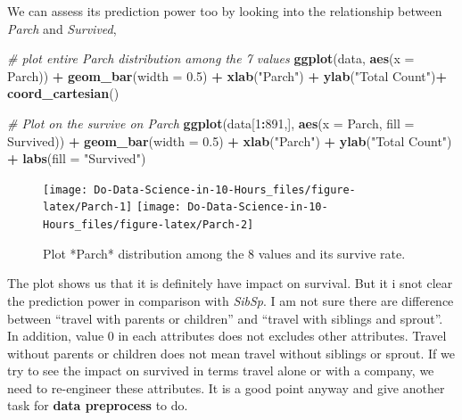 \documentclass[
]{book}
\newenvironment{Shaded}{\begin{snugshade}}{\end{snugshade}}
\newcommand{\CommentTok}[1]{\textcolor[rgb]{0.56,0.35,0.01}{\textit{#1}}}
\newcommand{\DataTypeTok}[1]{\textcolor[rgb]{0.13,0.29,0.53}{#1}}
\newcommand{\DecValTok}[1]{\textcolor[rgb]{0.00,0.00,0.81}{#1}}
\newcommand{\FloatTok}[1]{\textcolor[rgb]{0.00,0.00,0.81}{#1}}
\newcommand{\KeywordTok}[1]{\textcolor[rgb]{0.13,0.29,0.53}{\textbf{#1}}}
\newcommand{\NormalTok}[1]{#1}
\newcommand{\OperatorTok}[1]{\textcolor[rgb]{0.81,0.36,0.00}{\textbf{#1}}}
\newcommand{\StringTok}[1]{\textcolor[rgb]{0.31,0.60,0.02}{#1}}
\begin{document}
We can assess its prediction power too by looking into the relationship between \emph{Parch} and \emph{Survived},

\begin{Shaded}
\begin{Highlighting}[]
\CommentTok{# plot entire Parch distribution among the 7 values}
\KeywordTok{ggplot}\NormalTok{(data, }\KeywordTok{aes}\NormalTok{(}\DataTypeTok{x =}\NormalTok{ Parch)) }\OperatorTok{+}
\StringTok{  }\KeywordTok{geom_bar}\NormalTok{(}\DataTypeTok{width =} \FloatTok{0.5}\NormalTok{) }\OperatorTok{+}
\StringTok{  }\KeywordTok{xlab}\NormalTok{(}\StringTok{"Parch"}\NormalTok{) }\OperatorTok{+}
\StringTok{  }\KeywordTok{ylab}\NormalTok{(}\StringTok{"Total Count"}\NormalTok{)}\OperatorTok{+}
\StringTok{  }\KeywordTok{coord_cartesian}\NormalTok{()}

\CommentTok{# Plot on the survive on Parch}
\KeywordTok{ggplot}\NormalTok{(data[}\DecValTok{1}\OperatorTok{:}\DecValTok{891}\NormalTok{,], }\KeywordTok{aes}\NormalTok{(}\DataTypeTok{x =}\NormalTok{ Parch, }\DataTypeTok{fill =}\NormalTok{ Survived)) }\OperatorTok{+}
\StringTok{  }\KeywordTok{geom_bar}\NormalTok{(}\DataTypeTok{width =} \FloatTok{0.5}\NormalTok{) }\OperatorTok{+}
\StringTok{  }\KeywordTok{xlab}\NormalTok{(}\StringTok{"Parch"}\NormalTok{) }\OperatorTok{+}
\StringTok{  }\KeywordTok{ylab}\NormalTok{(}\StringTok{"Total Count"}\NormalTok{)  }\OperatorTok{+}
\StringTok{  }\KeywordTok{labs}\NormalTok{(}\DataTypeTok{fill =} \StringTok{"Survived"}\NormalTok{)}
\end{Highlighting}
\end{Shaded}

\begin{figure}

{\centering \texttt{[image: Do-Data-Science-in-10-Hours\_files/figure-latex/Parch-1]} \texttt{[image: Do-Data-Science-in-10-Hours\_files/figure-latex/Parch-2]} 

}

\caption{Plot *Parch* distribution among the 8 values and its survive rate.}\label{fig:Parch}
\end{figure}

The plot shows us that it is definitely have impact on survival. But it i snot clear the prediction power in comparison with \emph{SibSp}. I am not sure there are difference between ``travel with parents or children'' and ``travel with siblings and sprout''. In addition, value 0 in each attributes does not excludes other attributes. Travel without parents or children does not mean travel without siblings or sprout. If we try to see the impact on survived in terms travel alone or with a company, we need to re-engineer these attributes. It is a good point anyway and give another task for \textbf{data preprocess } to do.
\end{document}
